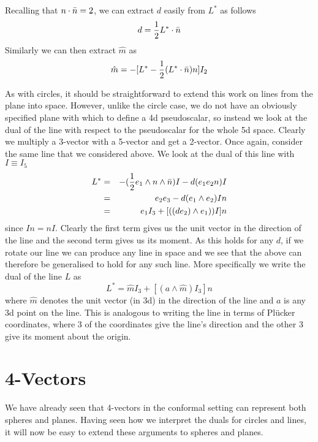 Recalling that $n\cdot\bar{n}=2$, we can extract $d$ easily
from $L^*$ as follows
%
\begin{equation}
 d = \frac{1}{2} L^*\cdot \bar{n}
\end{equation}
%
Similarly we can then extract $\hat{m}$ as
%
\begin{equation}
   \hat{m} = -[L^* - \frac{1}{2} (L^*\cdot\bar{n})n]I_2
\end{equation}
%

As with circles, it should be straightforward to
extend this work on lines from the plane into space.
However, unlike the circle case, we do not have an
obviously specified plane with which to define a 4d
pseudoscalar, so instead we look at the dual of the line
with respect to the pseudoscalar for the whole 5d space.
Clearly we multiply a 3-vector with a 5-vector and get a
2-vector. Once again, consider the same line that we
considered above.
We look at the dual of this line with $I\equiv I_5$
%
\begin{eqnarray}
L^* & = & -(\frac{1}{2} e_1\wedge n\wedge \bar{n})I - d(e_1 e_2 n)I
\nonumber \\
    & = &  e_2e_3 - d(e_1\wedge e_2)In \nonumber \\
    & = &  e_1I_3 + [((de_2)\wedge e_1))I]n
\end{eqnarray}
%
since $In=nI$. Clearly the first term gives us the unit
vector in the direction of the line and the second term
gives us its moment. As this holds for any $d$, if we
rotate our line we can produce any line in space and we
see that the above can therefore be generalised to hold
for any such line. More specifically we write the dual
of the line $L$ as
%
\[ L^* = \hat{m} I_3 + [(a \wedge \hat{m})I_3]n  \]
%
where $\hat{m}$ denotes the unit vector (in 3d) in the
direction of the line and $a$ is any 3d point on the
line. This is analogous to writing the line in terms of
Pl\"ucker coordinates, where 3 of the coordinates give
the line's direction and the other 3 give its moment
about the origin.

\section{4-Vectors}

We have already seen that 4-vectors in the conformal
setting can represent both spheres and planes. Having
seen how we interpret the duals for circles and lines, it
will now be easy to extend these arguments to spheres and
planes.

